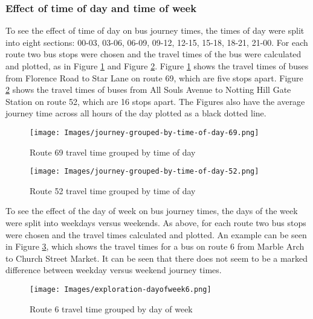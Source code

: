 \subsubsection{Effect of time of day and time of week}

To see the effect of time of day on bus journey times, the times of day were split into eight sections: 00-03, 03-06, 06-09, 09-12, 12-15, 15-18, 18-21, 21-00. For each route two bus stops were chosen and the travel times of the bus were calculated and plotted, as in Figure \ref{fig:time-of-day-69} and Figure \ref{fig:time-of-day-52}. Figure \ref{fig:time-of-day-69} shows the travel times of buses from Florence Road to Star Lane on route 69, which are five stops apart. Figure \ref{fig:time-of-day-52} shows the travel times of buses from All Souls Avenue to Notting Hill Gate Station on route 52, which are 16 stops apart. The Figures also have the average journey time across all hours of the day plotted as a black dotted line. 

\begin{figure}[H]
\begin{center}
    \texttt{[image: Images/journey-grouped-by-time-of-day-69.png]}
    \caption{Route 69 travel time grouped by time of day}
    \label{fig:time-of-day-69}
\end{center}
\end{figure}

\begin{figure}[H]
\begin{center}
    \texttt{[image: Images/journey-grouped-by-time-of-day-52.png]}
    \caption{Route 52 travel time grouped by time of day}
    \label{fig:time-of-day-52}
\end{center}
\end{figure}

To see the effect of the day of week on bus journey times, the days of the week were split into weekdays versus weekends. As above, for each route two bus stops were chosen and the travel times calculated and plotted. An example can be seen in Figure \ref{fig:day-of-week6}, which shows the travel times for a bus on route 6 from Marble Arch to Church Street Market. It can be seen that there does not seem to be a marked difference between weekday versus weekend journey times. 

\begin{figure}[H]
\begin{center}
    \texttt{[image: Images/exploration-dayofweek6.png]}
    \caption{Route 6 travel time grouped by day of week}
    \label{fig:day-of-week6}
\end{center}
\end{figure}

